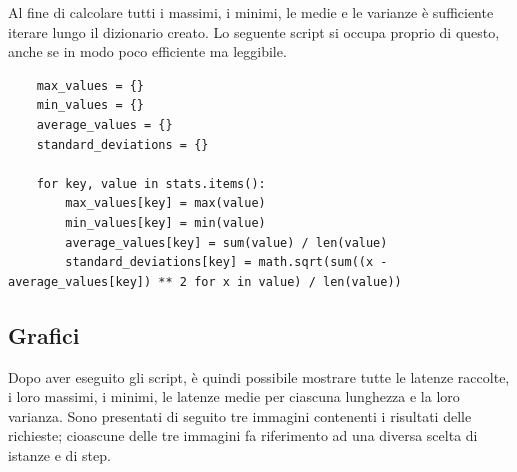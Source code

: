 \noindent Al fine di calcolare tutti i massimi, i minimi, le medie e le varianze è sufficiente iterare lungo il dizionario creato. Lo seguente script si occupa proprio di questo, anche se in modo poco efficiente ma leggibile.

\begin{lstlisting}
    max_values = {}
    min_values = {}
    average_values = {}
    standard_deviations = {}

    for key, value in stats.items():
        max_values[key] = max(value)
        min_values[key] = min(value)
        average_values[key] = sum(value) / len(value)
        standard_deviations[key] = math.sqrt(sum((x - average_values[key]) ** 2 for x in value) / len(value))
\end{lstlisting}

\vspace{10px}\subsection*{Grafici}

\noindent Dopo aver eseguito gli script, è quindi possibile mostrare tutte le latenze raccolte, i loro massimi, i minimi, le latenze medie per ciascuna lunghezza e la loro varianza. Sono presentati di seguito tre immagini contenenti i risultati delle richieste; cioascune delle tre immagini fa riferimento ad una diversa scelta di istanze e di step.

